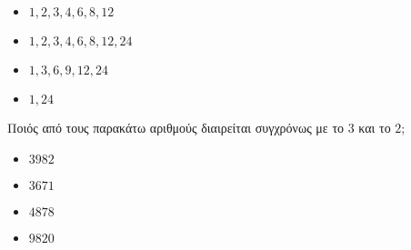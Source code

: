 \documentclass[ektypwsh]{diag-xelatex}
\begin{document}
\begin{thema}
\begin{rlist}
\begin{multicols}{4}
\begin{itemize}
\item $ 1,2,3,4,6,8,12 $
\item $ 1,2,3,4,6,8,12,24 $
\item $ 1,3,6,9,12,24 $
\item $ 1,24 $
\end{itemize}
\end{multicols}
\item Ποιός από τους παρακάτω αριθμούς διαιρείται συγχρόνως με το $ 3 $ και το $ 2 $;
\begin{multicols}{4}
\begin{itemize}
\item $ 3982 $
\item $ 3671 $
\item $ 4878 $
\item $ 9820 $
\end{itemize}
\end{multicols}
\end{rlist}
\end{thema}
\newpage
\noindent
\askhseis
\end{document}
